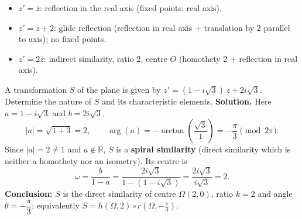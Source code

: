 \documentclass[11pt]{article}
\begin{document}
\begin{exemplebox}
\begin{itemize}
\item $z' = \bar{z}$: reflection in the real axis (fixed points: real axis).
\item $z' = \bar{z} + 2$: glide reflection (reflection in real axis + translation by $2$ parallel to axis); no fixed points.
\item $z' = 2\bar{z}$: indirect similarity, ratio $2$, centre $O$ (homothety $2$ + reflection in real axis).
\end{itemize}
\end{exemplebox}

\begin{exoresolu}
A transformation $S$ of the plane is given by $z' = (1 - i\sqrt{3})\,z + 2i\sqrt{3}$. Determine the nature of $S$ and its characteristic elements.
\tcblower
\textbf{Solution.} Here $a = 1 - i\sqrt{3}$ and $b = 2i\sqrt{3}$.
\[ |a| = \sqrt{1 + 3} = 2, \qquad \arg(a) = -\arctan\!\left(\frac{\sqrt{3}}{1}\right) = -\frac{\pi}{3} \pmod{2\pi}. \]
Since $|a| = 2 \neq 1$ and $a \notin \mathbb{R}$, $S$ is a \textbf{spiral similarity} (direct similarity which is neither a homothety nor an isometry). Its centre is
\[ \omega = \frac{b}{1-a} = \frac{2i\sqrt{3}}{1 - (1 - i\sqrt{3})} = \frac{2i\sqrt{3}}{i\sqrt{3}} = 2. \]
\textbf{Conclusion:} $S$ is the direct similarity of centre $\Omega(2, 0)$, ratio $k = 2$ and angle $\theta = -\dfrac{\pi}{3}$; equivalently $S = h(\Omega, 2) \circ r\!\left(\Omega, -\tfrac{\pi}{3}\right)$.
\end{exoresolu}
\end{document}
